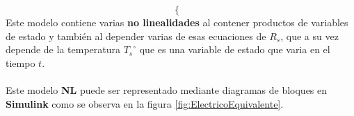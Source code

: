 \documentclass[10pt]{article}
\begin{document}
\begin{enumerate}
\begin{itemize}
\begin{equation}
\begin{cases}
			\end{cases}
		\end{equation}
		Este modelo contiene varias \textbf{no linealidades} al contener productos de variables de estado y también al depender varias de esas ecuaciones de $R_{s}$, que a su vez depende de la temperatura ${T_{s}}^{\circ}$ que es una variable de estado que varia en el tiempo $t$.
		\\
		\\
		Este modelo \textbf{NL} puede ser representado mediante diagramas de bloques en \textbf{Simulink} como se observa en la figura \ref{fig:ElectricoEquivalente}.

	\end{itemize}
  


\end{enumerate}
\end{document}
